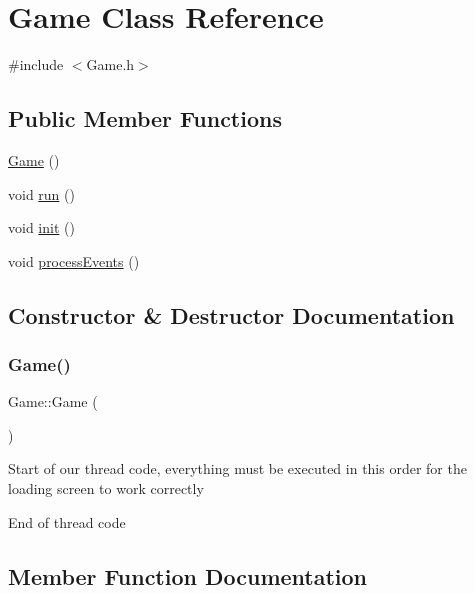 \hypertarget{class_game}{}\section{Game Class Reference}
\label{class_game}


{\ttfamily \#include $<$Game.\+h$>$}

\subsection*{Public Member Functions}
\begin{DoxyCompactItemize}
\item 
\mbox{\hyperlink{class_game_ad59df6562a58a614fda24622d3715b65}{Game}} ()
\item 
void \mbox{\hyperlink{class_game_a1ab78f5ed0d5ea879157357cf2fb2afa}{run}} ()
\item 
void \mbox{\hyperlink{class_game_a6f3a33940524b6ba9d83f627ccb14bbf}{init}} ()
\item 
void \mbox{\hyperlink{class_game_a79f698dda206dd7a9bed28b3f88bdc38}{process\+Events}} ()
\end{DoxyCompactItemize}


\subsection{Constructor \& Destructor Documentation}
\mbox{\label{class_game_ad59df6562a58a614fda24622d3715b65}} 
\subsubsection{\texorpdfstring{Game()}{Game()}}
{\footnotesize\ttfamily Game\+::\+Game (\begin{DoxyParamCaption}{ }\end{DoxyParamCaption})}

Start of our thread code, everything must be executed in this order for the loading screen to work correctly

End of thread code 

\subsection{Member Function Documentation}
\mbox{\label{class_game_a6f3a33940524b6ba9d83f627ccb14bbf}} 
